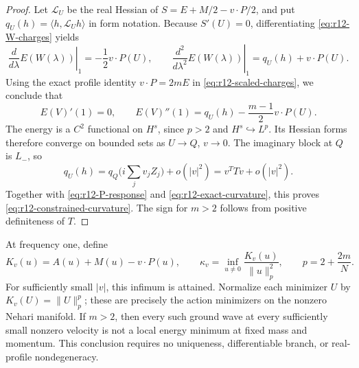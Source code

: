 \begin{proof}
Let $\mathcal L_U$ be the real Hessian of
$S=E+M/2-v\cdot P/2$, and put
$q_U(h)=\langle h,\mathcal L_Uh\rangle$ in form notation.
Because $S'(U)=0$, differentiating \eqref{eq:r12-W-charges} yields
\[
 \left.\frac{d}{d\lambda}E(W(\lambda))\right|_1=-\frac12v\cdot P(U),
 \qquad
 \left.\frac{d^2}{d\lambda^2}E(W(\lambda))\right|_1
 =q_U(h)+v\cdot P(U).
\]
Using the exact profile identity $v\cdot P=2mE$ in
\eqref{eq:r12-scaled-charges}, we conclude that
\begin{equation}\label{eq:r12-exact-curvature}
 E(V)'(1)=0,\qquad
 E(V)''(1)=q_U(h)-\frac{m-1}{2}v\cdot P(U).
\end{equation}
The energy is a $C^2$ functional on $H^s$, since $p>2$ and
$H^s\hookrightarrow L^p$. Its Hessian forms therefore converge on bounded
sets as $U\to Q$, $v\to0$. The imaginary block at $Q$ is $L_-$, so
\[
 q_U(h)=q_Q\Big(i\sum_jv_jZ_j\Big)+o(|v|^2)
 =v^TTv+o(|v|^2).
\]
Together with \eqref{eq:r12-P-response} and
\eqref{eq:r12-exact-curvature}, this proves
\eqref{eq:r12-constrained-curvature}. The sign for $m>2$ follows from
positive definiteness of $T$.
\end{proof}

\begin{corollary}
\label{cor:r12-all-ground-waves}
At frequency one, define
\[
 K_v(u)=A(u)+M(u)-v\cdot P(u),\qquad
 \kappa_v=\inf_{u\ne0}\frac{K_v(u)}{\|u\|_p^2},
 \qquad p=2+\frac{2m}{N}.
\]
For sufficiently small $|v|$, this infimum is attained. Normalize each
minimizer $U$ by $K_v(U)=\|U\|_p^p$; these are precisely the action
minimizers on the nonzero Nehari manifold. If $m>2$, then every such
ground wave at every sufficiently small nonzero velocity is not a local
energy minimum at fixed mass and momentum. This conclusion requires no
uniqueness, differentiable branch, or real-profile nondegeneracy.
\end{corollary}

